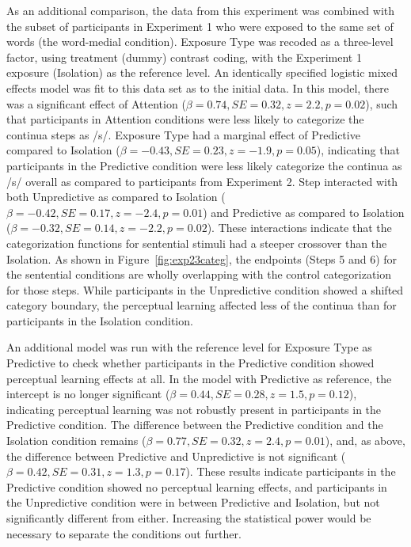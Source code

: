 As an additional comparison, the data from this experiment was combined with the subset of participants in Experiment 1 who were exposed to the same set of words (the word-medial condition).  
Exposure Type was recoded as a three-level factor, using treatment (dummy) contrast coding, with the Experiment 1 exposure (Isolation) as the reference level. 
An identically specified logistic mixed effects model was fit to this data set as to the initial data.  
In this model, there was a significant effect of Attention ($\beta = 0.74, SE = 0.32, z = 2.2, p = 0.02$), such that participants in Attention conditions were less likely to categorize the continua steps as /s/.  
Exposure Type had a marginal effect of Predictive compared to Isolation ($\beta = -0.43, SE = 0.23, z = -1.9, p = 0.05$), indicating that participants in the Predictive condition were less likely categorize the continua as /s/ overall as compared to participants from Experiment 2. 
Step interacted with both Unpredictive as compared to Isolation ($\beta = -0.42, SE = 0.17, z = -2.4, p = 0.01$) and Predictive as compared to Isolation ($\beta = -0.32, SE = 0.14, z = -2.2, p = 0.02$).
These interactions indicate that the categorization functions for sentential stimuli had a steeper crossover than the Isolation. 
As shown in Figure~\ref{fig:exp23categ}, the endpoints (Steps 5 and 6) for the sentential conditions are wholly overlapping with the control categorization for those steps.
While participants in the Unpredictive condition showed a shifted category boundary, the perceptual learning affected less of the continua than for participants in the Isolation condition.

An additional model was run with the reference level for Exposure Type as Predictive to check whether participants in the Predictive condition showed perceptual learning effects at all.
In the model with Predictive as reference, the intercept is no longer significant ($\beta = 0.44, SE = 0.28, z = 1.5, p = 0.12$), indicating perceptual learning was not robustly present in participants in the Predictive condition.  
The difference between the Predictive condition and the Isolation condition remains ($\beta = 0.77, SE = 0.32, z = 2.4, p = 0.01$), and, as above, the difference between Predictive and Unpredictive is not significant ($\beta = 0.42, SE = 0.31, z = 1.3, p = 0.17$).
These results indicate participants in the Predictive condition showed no perceptual learning effects, and participants in the Unpredictive condition were in between Predictive and Isolation, but not significantly different from either.  
Increasing the statistical power would be necessary to separate the conditions out further.


